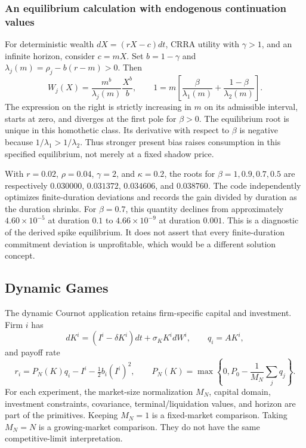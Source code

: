 \subsubsection{An equilibrium calculation with endogenous continuation values}
For deterministic wealth $dX=(rX-c)dt$, CRRA utility with $\gamma>1$, and an infinite horizon, consider $c=mX$. Set $b=1-\gamma$ and $\lambda_j(m)=\rho_j-b(r-m)>0$. Then
\begin{equation}\label{eq:temporalroot}
 W_j(X)=\frac{m^b}{\lambda_j(m)}\frac{X^b}{b},\qquad
 1=m\left[\frac\beta{\lambda_1(m)}+\frac{1-\beta}{\lambda_2(m)}\right].
\end{equation}
The expression on the right is strictly increasing in $m$ on its admissible interval, starts at zero, and diverges at the first pole for $\beta>0$. The equilibrium root is unique in this homothetic class. Its derivative with respect to $\beta$ is negative because $1/\lambda_1>1/\lambda_2$. Thus stronger present bias raises consumption in this specified equilibrium, not merely at a fixed shadow price.

With $r=0.02$, $\rho=0.04$, $\gamma=2$, and $\kappa=0.2$, the roots for $\beta=1,0.9,0.7,0.5$ are respectively $0.030000$, $0.031372$, $0.034606$, and $0.038760$. The code independently optimizes finite-duration deviations and records the gain divided by duration as the duration shrinks. For $\beta=0.7$, this quantity declines from approximately $4.60\times10^{-5}$ at duration $0.1$ to $4.66\times10^{-9}$ at duration $0.001$. This is a diagnostic of the derived spike equilibrium. It does not assert that every finite-duration commitment deviation is unprofitable, which would be a different solution concept.

\subsection{Dynamic Games}\label{sec:games}
The dynamic Cournot application retains firm-specific capital and investment. Firm $i$ has
\[
 dK^i=(I^i-\delta K^i)dt+\sigma_K K^i dW^i,\qquad q_i=AK^i,
\]
and payoff rate
\[
 r_i=P_N(K)q_i-I^i-\tfrac12 b_i(I^i)^2,\qquad
 P_N(K)=\max\left\{0,P_0-\frac1{M_N}\sum_jq_j\right\}.
\]
For each experiment, the market-size normalization $M_N$, capital domain, investment constraints, covariance, terminal/liquidation values, and horizon are part of the primitives. Keeping $M_N=1$ is a fixed-market comparison. Taking $M_N=N$ is a growing-market comparison. They do not have the same competitive-limit interpretation.

